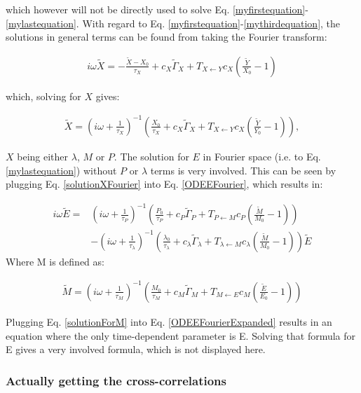 which however will not be directly used to solve Eq. \ref{myfirstequation}-\ref{mylastequation}. With regard to  Eq. \ref{myfirstequation}-\ref{mythirdequation}, the solutions in general terms can be found from taking the Fourier transform:

\begin{align}
i \omega \tilde{X} = - \frac{\tilde{X}-X_0}{\tau_X} + c_X \tilde{\Gamma}_X + T_{X \leftarrow Y} c_X (\frac{\tilde{Y}}{X_0} - 1)
\end{align}

which, solving for $X$ gives:

\begin{align}
\label{solutionXFourier}
\tilde{X} = \left( i \omega + \frac{1}{\tau_X} \right)^{-1} \left( \frac{X_0}{\tau_X} + c_X \tilde{\Gamma}_X + T_{X \leftarrow Y} c_X (\frac{\tilde{Y}}{Y_0} - 1) \right)
,
\end{align}

$X$ being either $\lambda$, $M$ or $P$.
%
The solution for $E$ in Fourier space (i.e. to Eq. \ref{mylastequation}) without $P$ or $\lambda$ terms is very involved. This can be seen by plugging Eq. \ref{solutionXFourier} into Eq. \ref{ODEEFourier}, which results in:

\begin{align}
\label{ODEEFourierExpanded}
i\omega \tilde{E} = & 
\left( i \omega + \frac{1}{\tau_P} \right)^{-1} \left( \frac{P_0}{\tau_P} + c_P \tilde{\Gamma}_P + T_{P \leftarrow M} c_P (\frac{\tilde{M}}{M_0} - 1) \right)
     \nonumber \\
    & -
    \left( i \omega + \frac{1}{\tau_\lambda} \right)^{-1} \left( \frac{\lambda_0}{\tau_\lambda} + c_\lambda \tilde{\Gamma}_\lambda + T_{\lambda \leftarrow M} c_\lambda (\frac{\tilde{M}}{M_0} - 1) \right)
     \tilde{E}
\end{align}
Where M is defined as:

\begin{align}
\label{solutionForM}
\tilde{M} = \left( i \omega + \frac{1}{\tau_M} \right)^{-1} \left( \frac{M_0}{\tau_M} + c_M \tilde{\Gamma}_M + T_{M \leftarrow E} c_M (\frac{\tilde{E}}{E_0} - 1) \right)
\end{align}

Plugging Eq. \ref{solutionForM} into Eq. \ref{ODEEFourierExpanded} results in an equation where the only time-dependent parameter is E.
Solving that formula for E gives a very involved formula, which is not displayed here.

\subsubsection*{Actually getting the cross-correlations}

